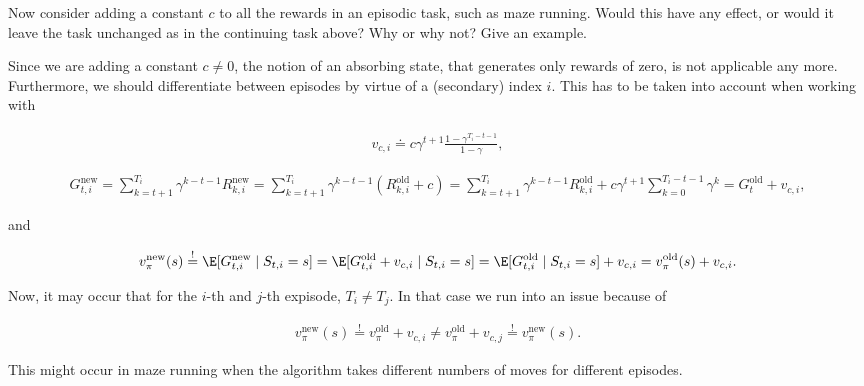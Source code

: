 
\begin{exercise}[Exercise 3.16]

Now consider adding a constant $c$ to all the rewards in an episodic task, such as maze running.
Would this have any effect, or would it leave the task unchanged as in the continuing task above?
Why or why not?
Give an example.    

\end{exercise}


\begin{solution}

Since we are adding a constant $c \neq 0$, the notion of an absorbing state, that generates only rewards of zero, is not applicable any more.
Furthermore, we should differentiate between episodes by virtue of a (secondary) index $i$.
This has to be taken into account when working with

\begin{align*}
    v_{c, i} \doteq c \gamma^{t+1} \frac{1 - \gamma^{T_i - t - 1}}{1 - \gamma},
\end{align*}

\begin{align*}
    G_{t, i}^\text{new}
    =
    \sum_{k=t+1}^{T_i}
        \gamma^{k-t-1} R_{k, i}^\text{new}
    =
    \sum_{k=t+1}^{T_i}
        \gamma^{k-t-1} (R_{k, i}^\text{old} + c)
    =
    \sum_{k=t+1}^{T_i}
        \gamma^{k-t-1} R_{k, i}^\text{old}
    +
    c \gamma^{t+1}
    \sum_{k=0}^{T_i - t - 1}
        \gamma^k
    =
    G_t^\text{old} + v_{c, i},
\end{align*}

and

\begin{align*}
    v_\pi^\text{new}(s)
    \stackrel{!}{=}
    \E[G_{t, i}^\text{new} \mid S_{t, i} = s]
    =
    \E[G_{t, i}^\text{old} + v_{c, i} \mid S_{t, i} = s]
    =
    \E[G_{t, i}^\text{old} \mid S_{t, i} = s] + v_{c, i}
    =
    v_\pi^\text{old}(s) + v_{c, i}.
\end{align*}

Now, it may occur that for the $i$-th and $j$-th expisode, $T_i \neq T_j$.
In that case we run into an issue because of

\begin{align*}
    v_\pi^\text{new}(s)
    \stackrel{!}{=}
    v_\pi^\text{old} + v_{c, i}
    \neq
    v_\pi^\text{old} + v_{c, j}
    \stackrel{!}{=}
    v_\pi^\text{new}(s).
\end{align*}

This might occur in maze running when the algorithm takes different numbers of moves for different episodes.

\end{solution}

